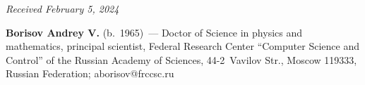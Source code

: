 \vspace*{-6pt}

\hfill{\small\textit{Received February 5, 2024}} 

\vspace*{-18pt}


\Contrl

\vspace*{-3pt}

\noindent
\textbf{Borisov Andrey V.} (b.\ 1965)~--- 
Doctor of Science in physics and mathematics, principal scientist, Federal Research Center ``Computer Science and Control''
 of the Russian Academy of Sciences, 44-2~Vavilov Str., Moscow 119333, Russian Federation; \mbox{aborisov@frccsc.ru}






\label{end\stat}

\renewcommand{\bibname}{\protect\rm Литература} 